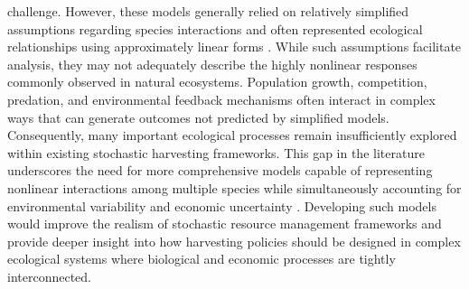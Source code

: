 \documentclass[11pt]{article}
\begin{document}
challenge. However, these models generally relied on relatively simplified assumptions regarding species interactions and often represented ecological relationships using approximately linear forms \citep{feynman_1949,bellman_1957}. While such assumptions facilitate analysis, they may not adequately describe the highly nonlinear responses commonly observed in natural ecosystems. Population growth, competition, predation, and environmental feedback mechanisms often interact in complex ways that can generate outcomes not predicted by simplified models. Consequently, many important ecological processes remain insufficiently explored within existing stochastic harvesting frameworks. This gap in the literature underscores the need for more comprehensive models capable of representing nonlinear interactions among multiple species while simultaneously accounting for environmental variability and economic uncertainty \citep{pramanik2021consensus}. Developing such models would improve the realism of stochastic resource management frameworks and provide deeper insight into how harvesting policies should be designed in complex ecological systems where biological and economic processes are tightly interconnected.
	
\end{document}
